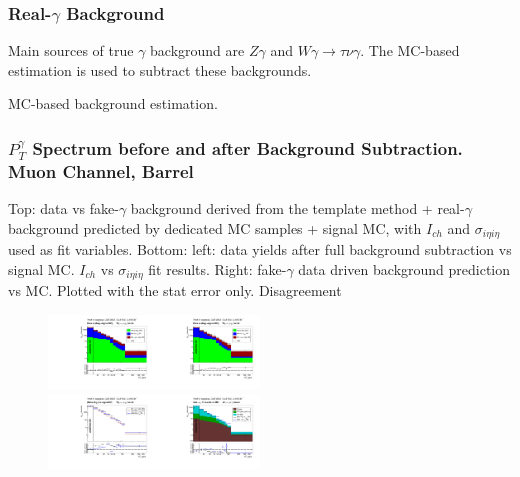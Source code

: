 \begin{frame}\frametitle {Real-$\gamma$ Background}

Main sources of true $\gamma$ background are $Z\gamma$ and $W\gamma \rightarrow \tau \nu \gamma$. The MC-based estimation is used to subtract these backgrounds.

MC-based background estimation.

\end{frame}%

\begin{frame}\frametitle{\footnotesize{$P_T^{\gamma}$ Spectrum before and after Background Subtraction. Muon Channel, Barrel}}
  \tiny{Top: data vs fake-$\gamma$ background derived from the template method + real-$\gamma$ background predicted by dedicated MC samples + signal MC, with $I_{ch}$ and $\sigma_{i\eta{i}\eta}$ used as fit variables. Bottom: left: data yields after full background subtraction vs signal MC. $I_{ch}$ vs $\sigma_{i\eta{i}\eta}$ fit results. Right: fake-$\gamma$ data driven background prediction vs MC. Plotted with the stat error only. Disagreement}
  \begin{figure}[htb]
    \begin{center}
       \includegraphics[width=0.25\textwidth]{../figs/figs_v11/MUON_WGamma/PrepareYields/c_DATAvsBkgPlusSigMCc_MUON_WGamma_TEMPL_CHISO_UNblind__Barrel__phoEt.pdf}\includegraphics[width=0.25\textwidth]{../figs/figs_v11/MUON_WGamma/PrepareYields/c_DATAvsBkgPlusSigMCc_MUON_WGamma_TEMPL_SIHIH_UNblind__Barrel__phoEt.pdf}\\
       \includegraphics[width=0.25\textwidth]{../figs/figs_v11/MUON_WGamma/PrepareYields/c_BkgSubtrDATAvsSIGMC_c_MUON_WGamma__UNblind__Barrel__phoEt.pdf}\includegraphics[width=0.25\textwidth]{../figs/figs_v11/MUON_WGamma/PrepareYields/c_FakeDDvsMC_c_MUON_WGamma__UNblind__Barrel__phoEt.pdf}\\
    \end{center}
  \end{figure}
\end{frame}%

